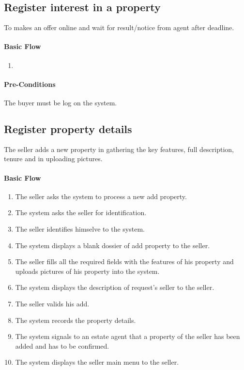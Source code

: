 \documentclass[a4paper,12pt]{article}
\begin{document}
\subsection{Register interest in a property}

To makes an offer online and wait for result/notice from agent after deadline.

\paragraph{Basic Flow}
\begin{enumerate}
\item
\end{enumerate}
\paragraph{Pre-Conditions}
The buyer must be log on the system.

\subsection{Register property details}

The seller adds a new property in gathering the key features, full description, tenure and in uploading pictures.

\paragraph{Basic Flow}
\begin{enumerate}
\item The seller asks the system to process a new add property.
\item The system asks the seller for identification.
\item The seller identifies himselve to the system.
\item The system displays a blank dossier of add property to the seller.
\item The seller fills all the required fields with the features of his property and uploads pictures of his property into the system.
\item The system displays the description of request's seller to the seller.
\item The seller valids his add.
\item The system records the property details.
\item The system signals to an estate agent that a property of the seller has been added and has to be confirmed.
\item The system displays the seller main menu to the seller.
\end{enumerate}
\end{document}
